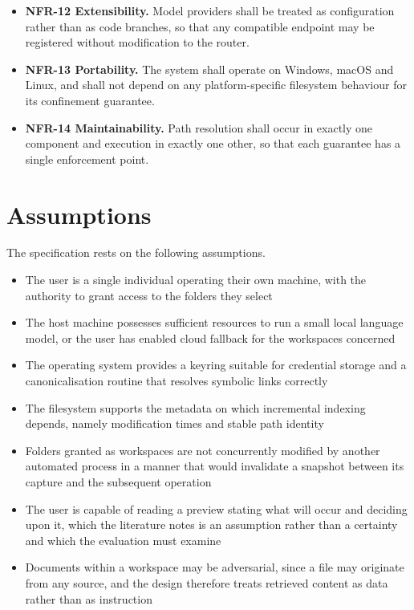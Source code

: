 \documentclass{FastFyp}
\begin{document}
\begin{itemize}
    \item \textbf{NFR-12 Extensibility.} Model providers shall be treated as configuration rather than as code branches, so that any compatible endpoint may be registered without modification to the router.
    \item \textbf{NFR-13 Portability.} The system shall operate on Windows, macOS and Linux, and shall not depend on any platform-specific filesystem behaviour for its confinement guarantee.
    \item \textbf{NFR-14 Maintainability.} Path resolution shall occur in exactly one component and execution in exactly one other, so that each guarantee has a single enforcement point.
\end{itemize}

\section{Assumptions}
The specification rests on the following assumptions.

\begin{itemize}
    \item The user is a single individual operating their own machine, with the authority to grant access to the folders they select
    \item The host machine possesses sufficient resources to run a small local language model, or the user has enabled cloud fallback for the workspaces concerned
    \item The operating system provides a keyring suitable for credential storage and a canonicalisation routine that resolves symbolic links correctly
    \item The filesystem supports the metadata on which incremental indexing depends, namely modification times and stable path identity
    \item Folders granted as workspaces are not concurrently modified by another automated process in a manner that would invalidate a snapshot between its capture and the subsequent operation
    \item The user is capable of reading a preview stating what will occur and deciding upon it, which the literature notes is an assumption rather than a certainty and which the evaluation must examine
    \item Documents within a workspace may be adversarial, since a file may originate from any source, and the design therefore treats retrieved content as data rather than as instruction
\end{itemize}
\end{document}
